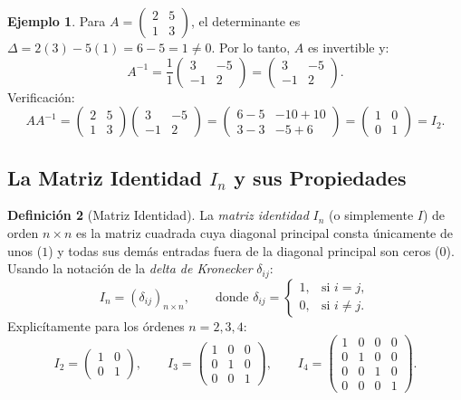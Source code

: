\documentclass[11pt,letterpaper]{article}
\theoremstyle{definition}
\newtheorem{definicion}{Definición}[section]
\newtheorem{ejemplo}[definicion]{Ejemplo}
\theoremstyle{plain}
\begin{document}
\begin{ejemplo}
Para $A = \begin{pmatrix} 2 & 5 \\ 1 & 3 \end{pmatrix}$, el determinante es $\Delta = 2(3) - 5(1) = 6 - 5 = 1 \neq 0$.
Por lo tanto, $A$ es invertible y:
\[
A^{-1} = \frac{1}{1} \begin{pmatrix} 3 & -5 \\ -1 & 2 \end{pmatrix} = \begin{pmatrix} 3 & -5 \\ -1 & 2 \end{pmatrix}.
\]
Verificación:
\[
A A^{-1} = \begin{pmatrix} 2 & 5 \\ 1 & 3 \end{pmatrix} \begin{pmatrix} 3 & -5 \\ -1 & 2 \end{pmatrix}
= \begin{pmatrix} 6-5 & -10+10 \\ 3-3 & -5+6 \end{pmatrix} = \begin{pmatrix} 1 & 0 \\ 0 & 1 \end{pmatrix} = I_2.
\]
\end{ejemplo}

\subsection{La Matriz Identidad $I_n$ y sus Propiedades}

\begin{definicion}[Matriz Identidad]
La \emph{matriz identidad} $I_n$ (o simplemente $I$) de orden $n\times n$ es la matriz cuadrada cuya diagonal principal consta únicamente de unos ($1$) y todas sus demás entradas fuera de la diagonal principal son ceros ($0$). Usando la notación de la \emph{delta de Kronecker} $\delta_{ij}$:
\[
I_n = (\delta_{ij})_{n\times n}, \qquad \text{donde } \delta_{ij} = \begin{cases} 1, & \text{si } i = j, \\ 0, & \text{si } i \neq j. \end{cases}
\]
Explicítamente para los órdenes $n=2, 3, 4$:
\[
I_2 = \begin{pmatrix} 1 & 0 \\ 0 & 1 \end{pmatrix}, \qquad
I_3 = \begin{pmatrix} 1 & 0 & 0 \\ 0 & 1 & 0 \\ 0 & 0 & 1 \end{pmatrix}, \qquad
I_4 = \begin{pmatrix} 1 & 0 & 0 & 0 \\ 0 & 1 & 0 & 0 \\ 0 & 0 & 1 & 0 \\ 0 & 0 & 0 & 1 \end{pmatrix}.
\]
\end{definicion}
\end{document}
